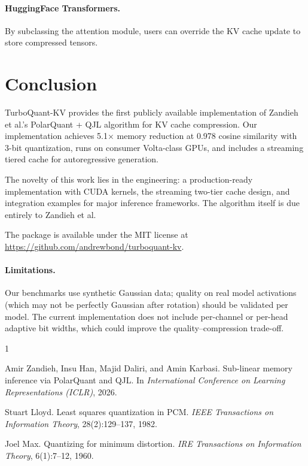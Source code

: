 \documentclass{article}
\begin{document}
\paragraph{HuggingFace Transformers.}
By subclassing the attention module, users can override the KV cache
update to store compressed tensors.

\section{Conclusion}
\label{sec:conclusion}

TurboQuant-KV provides the first publicly available implementation of
Zandieh et al.'s PolarQuant + QJL algorithm for KV cache compression.
Our implementation achieves 5.1$\times$ memory reduction at 0.978 cosine
similarity with 3-bit quantization, runs on consumer Volta-class GPUs,
and includes a streaming tiered cache for autoregressive generation.

The novelty of this work lies in the engineering: a production-ready
implementation with CUDA kernels, the streaming two-tier cache design,
and integration examples for major inference frameworks.  The algorithm
itself is due entirely to Zandieh et al.

The package is available under the MIT license at
\url{https://github.com/andrewbond/turboquant-kv}.

\paragraph{Limitations.}
Our benchmarks use synthetic Gaussian data; quality on real model
activations (which may not be perfectly Gaussian after rotation) should
be validated per model.  The current implementation does not include
per-channel or per-head adaptive bit widths, which could improve the
quality--compression trade-off.




\begin{thebibliography}{1}

Amir Zandieh, Insu Han, Majid Daliri, and Amin Karbasi.
\newblock Sub-linear memory inference via PolarQuant and QJL.
\newblock In \emph{International Conference on Learning Representations
  (ICLR)}, 2026.

Stuart Lloyd.
\newblock Least squares quantization in PCM.
\newblock \emph{IEEE Transactions on Information Theory},
  28(2):129--137, 1982.

Joel Max.
\newblock Quantizing for minimum distortion.
\newblock \emph{IRE Transactions on Information Theory},
  6(1):7--12, 1960.

\end{thebibliography}
\end{document}
